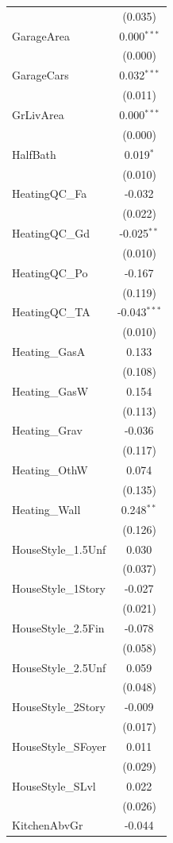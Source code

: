 \begin{table}[!htbp]
\begin{tabular}{@{\extracolsep{5pt}}lc}
& (0.035) \\
 GarageArea & 0.000$^{***}$ \\
& (0.000) \\
 GarageCars & 0.032$^{***}$ \\
& (0.011) \\
 GrLivArea & 0.000$^{***}$ \\
& (0.000) \\
 HalfBath & 0.019$^{*}$ \\
& (0.010) \\
 HeatingQC_Fa & -0.032$^{}$ \\
& (0.022) \\
 HeatingQC_Gd & -0.025$^{**}$ \\
& (0.010) \\
 HeatingQC_Po & -0.167$^{}$ \\
& (0.119) \\
 HeatingQC_TA & -0.043$^{***}$ \\
& (0.010) \\
 Heating_GasA & 0.133$^{}$ \\
& (0.108) \\
 Heating_GasW & 0.154$^{}$ \\
& (0.113) \\
 Heating_Grav & -0.036$^{}$ \\
& (0.117) \\
 Heating_OthW & 0.074$^{}$ \\
& (0.135) \\
 Heating_Wall & 0.248$^{**}$ \\
& (0.126) \\
 HouseStyle_1.5Unf & 0.030$^{}$ \\
& (0.037) \\
 HouseStyle_1Story & -0.027$^{}$ \\
& (0.021) \\
 HouseStyle_2.5Fin & -0.078$^{}$ \\
& (0.058) \\
 HouseStyle_2.5Unf & 0.059$^{}$ \\
& (0.048) \\
 HouseStyle_2Story & -0.009$^{}$ \\
& (0.017) \\
 HouseStyle_SFoyer & 0.011$^{}$ \\
& (0.029) \\
 HouseStyle_SLvl & 0.022$^{}$ \\
& (0.026) \\
 KitchenAbvGr & -0.044$^{}$ \\

\end{tabular}
\end{table}
